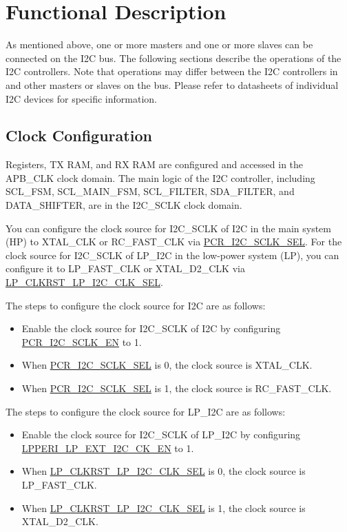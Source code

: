 \documentclass[main\_\_EN.tex]{subfiles}
\begin{document}
\section{Functional Description}

As mentioned above, one or more masters and one or more slaves can be connected on the I2C bus. The following sections describe the operations of the \chipname{} I2C controllers. Note that operations may differ between the I2C controllers in \chipname{} and other masters or slaves on the bus. Please refer to datasheets of individual I2C devices for specific information.

\subsection{Clock Configuration}

Registers, TX RAM, and RX RAM are configured and accessed in the APB\_CLK clock domain. The main logic of the I2C controller, including SCL\_FSM, SCL\_MAIN\_FSM, SCL\_FILTER, SDA\_FILTER, and DATA\_SHIFTER, are in the I2C\_SCLK clock domain.

You can configure the clock source for I2C\_SCLK of I2C in the main system (HP) to XTAL\_CLK or RC\_FAST\_CLK via \hyperref[fielddesc:PCRI2CSCLKSEL]{PCR\_I2C\_SCLK\_SEL}. For the clock source for I2C\_SCLK of LP\_I2C in the low-power system (LP), you can configure it to LP\_FAST\_CLK or XTAL\_D2\_CLK via \hyperref[fielddesc:LPCLKRSTLPI2CCLKSEL]{LP\_CLKRST\_LP\_I2C\_CLK\_SEL}.

The steps to configure the clock source for I2C are as follows:

\begin{itemize}
    \item Enable the clock source for I2C\_SCLK of I2C by configuring \hyperref[fielddesc:PCRI2CSCLKEN]{PCR\_I2C\_SCLK\_EN} to 1.
    \item When \hyperref[fielddesc:PCRI2CSCLKSEL]{PCR\_I2C\_SCLK\_SEL} is 0, the clock source is XTAL\_CLK.
    \item When \hyperref[fielddesc:PCRI2CSCLKSEL]{PCR\_I2C\_SCLK\_SEL} is 1, the clock source is RC\_FAST\_CLK.
\end{itemize}

The steps to configure the clock source for LP\_I2C are as follows:

\begin{itemize}
    \item Enable the clock source for I2C\_SCLK of LP\_I2C by configuring \hyperref[fielddesc:LPPERILPEXTI2CCKEN]{LPPERI\_LP\_EXT\_I2C\_CK\_EN} to 1.
    \item When \hyperref[fielddesc:LPCLKRSTLPI2CCLKSEL]{LP\_CLKRST\_LP\_I2C\_CLK\_SEL} is 0, the clock source is LP\_FAST\_CLK.
    \item When \hyperref[fielddesc:LPCLKRSTLPI2CCLKSEL]{LP\_CLKRST\_LP\_I2C\_CLK\_SEL} is 1, the clock source is XTAL\_D2\_CLK.
\end{itemize}
\end{document}
